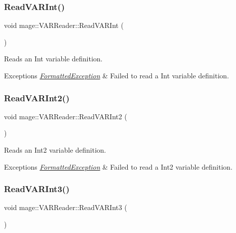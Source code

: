\subsubsection{\texorpdfstring{Read\+V\+A\+R\+Int()}{ReadVARInt()}}
{\footnotesize\ttfamily void mage\+::\+V\+A\+R\+Reader\+::\+Read\+V\+A\+R\+Int (\begin{DoxyParamCaption}{ }\end{DoxyParamCaption})\hspace{0.3cm}{\ttfamily [private]}}

Reads an Int variable definition.


\begin{DoxyExceptions}{Exceptions}
{\em \hyperlink{classmage_1_1_formatted_exception}{Formatted\+Exception}} & Failed to read a Int variable definition. \\
\hline
\end{DoxyExceptions}
\hypertarget{classmage_1_1_v_a_r_reader_a33bc794769330f6d4593dfbfceaa0c95}{}\label{classmage_1_1_v_a_r_reader_a33bc794769330f6d4593dfbfceaa0c95} 
\subsubsection{\texorpdfstring{Read\+V\+A\+R\+Int2()}{ReadVARInt2()}}
{\footnotesize\ttfamily void mage\+::\+V\+A\+R\+Reader\+::\+Read\+V\+A\+R\+Int2 (\begin{DoxyParamCaption}{ }\end{DoxyParamCaption})\hspace{0.3cm}{\ttfamily [private]}}

Reads an Int2 variable definition.


\begin{DoxyExceptions}{Exceptions}
{\em \hyperlink{classmage_1_1_formatted_exception}{Formatted\+Exception}} & Failed to read a Int2 variable definition. \\
\hline
\end{DoxyExceptions}
\hypertarget{classmage_1_1_v_a_r_reader_a8a809be1eeebc2649e16524d8c65529f}{}\label{classmage_1_1_v_a_r_reader_a8a809be1eeebc2649e16524d8c65529f} 
\subsubsection{\texorpdfstring{Read\+V\+A\+R\+Int3()}{ReadVARInt3()}}
{\footnotesize\ttfamily void mage\+::\+V\+A\+R\+Reader\+::\+Read\+V\+A\+R\+Int3 (\begin{DoxyParamCaption}{ }\end{DoxyParamCaption})\hspace{0.3cm}{\ttfamily [private]}}

